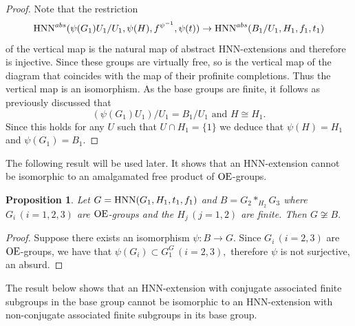 \documentclass[a4paper,12pt]{article}
\newtheorem{prop}[thm]{Proposition}
\def\OE{{\rm OE}}
\def\hnn {{\rm HNN}}
\begin{document}
{\begin{proof}
Note that the restriction $$\hnn^{abs}( \psi(G_1)U_1/U_1,  \psi(H),  f^{\psi^{-1}}, \psi(t))\rightarrow \hnn^{abs}( B_1/U_1,  H_1, f_1, t_1)$$ of the vertical map is the natural map of abstract HNN-extensions and therefore is injective. Since these groups are virtually free, so is the vertical map of the diagram that coincides with the map of  their profinite completions. Thus the vertical map is an isomorphism. As the base groups are finite, it follows as previously discussed that $$(\psi(G_1)U_1)/U_1= B_1/U_1 \mbox{ and } H\cong H_1.$$ Since this holds for any $U$ such that $U\cap H_1=\{1\}$ we deduce that $\psi(H) = H_1$ and $\psi(G_1) =B_{1}.$ 
\end{proof}

The following result will be used later. It shows that  an HNN-extension cannot be isomorphic to an  amalgamated free product of $\OE$-groups.

\begin{prop} \label{HNN nao iso Amalg}
Let $G= \hnn(G_1, H_1, t_1, f_1)$ and $B=G_2 *_{H_2} G_3$ where $G_i \,(i=1,2,3)$ are $\OE$-groups and the $H_j \, (j=1,2)$ are finite. Then $G \not \cong B.$  
\end{prop}

\begin{proof} Suppose there exists an isomorphism $\psi: B \longrightarrow G.$ Since $G_i \, (i=2,3)$ are $\OE$-groups, we have that $\psi(G_i) \subset G_1^G \,(i=2,3),$ therefore $\psi$ is not surjective, an absurd. 
\end{proof} 


The result below shows that an HNN-extension with conjugate associated finite subgroups  in the base group cannot be isomorphic to an HNN-extension with non-conjugate associated finite  subgroups in its base group. 



}
\end{document}
